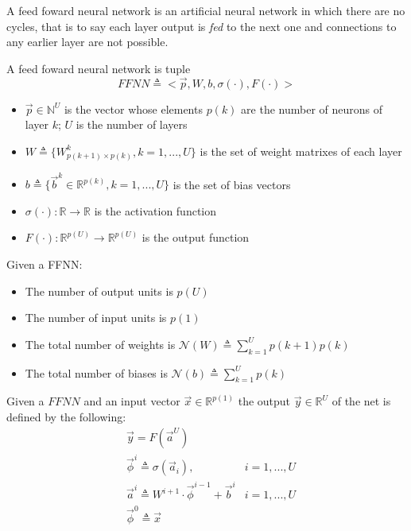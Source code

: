 
A feed foward neural network is an artificial neural network in which there are no cycles, that is to say each layer output is \textit{fed} to the next one and connections to any earlier layer are not possible. 


\begin{defn}
\label{def_ffnn}
A feed foward neural network is tuple
$$FFNN\triangleq<\vec{p},W,b,\sigma(\cdot),F(\cdot)>$$
\begin{itemize}
 \item $\vec{p} \in \mathbb{N}^U$ is the vector whose elements $p(k)$ are the number of neurons of layer $k$; $U$ is the number of layers
 \item $W\triangleq \{W^k_{p(k+1) \times p(k)}, k=1,...,U \}$ is the set of weight matrixes of each layer
 \item $b \triangleq \{\vec{b}^k \in \mathbb{R}^{p(k)}, k=1,...,U \} $ is the set of bias vectors
 \item $\sigma(\cdot): \mathbb{R}\rightarrow \mathbb{R}$ is the activation function
 \item $F(\cdot): \mathbb{R}^{p(U)}\rightarrow \mathbb{R}^{p(U)}$ is the output function
\end{itemize}
\end{defn}

\begin{remark}{}
Given a FFNN:
\begin{itemize}
 \item The number of output units is $p(U)$
 \item The number of input units is $p(1)$
 \item The total number of weights is $\mathcal{N}(W) \triangleq \sum_{k=1}^U p(k+1)p(k)$
 \item The total number of biases is $\mathcal{N}(b) \triangleq \sum_{k=1}^U p(k)$
\end{itemize}
\end{remark}

\begin{defn}
Given a $FFNN$ and an input vector $\vec{x} \in \mathbb{R}^{p(1)}$ the output $\vec{y} \in \mathbb{R}^U$ of the net is defined by the following:
\begin{align}
&\vec{y}=F(\vec{a}^{U}) &\\
&\vec{\phi}^{i} \triangleq \sigma(\vec{a}_{i}), & i=1,...,U\\
&\vec{a}^{i} \triangleq W^{i+1} \cdot \vec{\phi}^{i-1} +\vec{b}^i  & i=1,...,U\\
&\vec{\phi}^{0} \triangleq \vec{x} &
\end{align}
\end{defn}


